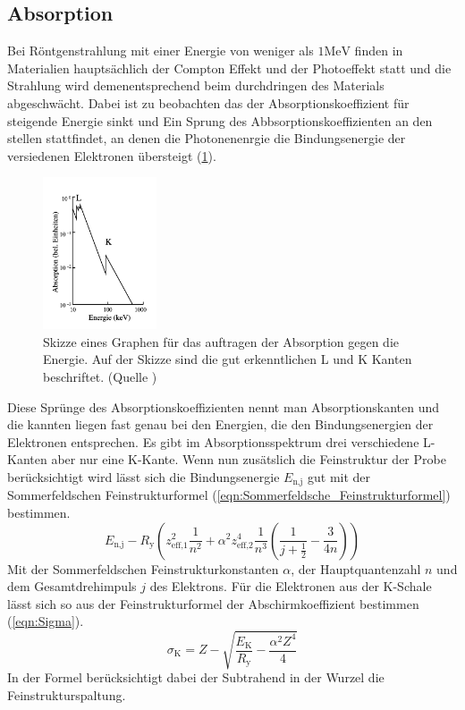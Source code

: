 \subsection{Absorption}
Bei Röntgenstrahlung mit einer Energie von weniger als $1 \text{MeV}$ finden in Materialien hauptsächlich der Compton Effekt und der Photoeffekt statt und die Strahlung wird demenentsprechend beim durchdringen des Materials abgeschwächt.
Dabei ist zu beobachten das der Absorptionskoeffizient für steigende Energie sinkt und Ein Sprung des Abbsorptionskoeffizienten an den stellen stattfindet, an denen die Photonenenrgie die Bindungsenergie der versiedenen Elektronen übersteigt (\ref{fig:Absorption}).
\begin{figure}
    \centering
    \includegraphics[width=0.3\textwidth]{bilder/Absorption.png}
    \caption{Skizze eines Graphen für das auftragen der Absorption gegen die Energie. Auf der Skizze sind die gut erkenntlichen L und K Kanten beschriftet. (Quelle \cite{Anleitung})}
    \label{fig:Absorption}
\end{figure}
Diese Sprünge des Absorptionskoeffizienten nennt man Absorptionskanten und die kannten liegen fast genau bei den Energien, die den Bindungsenergien der Elektronen entsprechen.
Es gibt im Absorptionsspektrum  drei verschiedene L-Kanten aber nur eine K-Kante.
Wenn nun zusätslich die Feinstruktur der Probe berücksichtigt wird lässt sich die Bindungsenergie $E_{\text{n,j}}$ gut mit der Sommerfeldschen Feinstrukturformel (\ref{eqn:Sommerfeldsche_Feinstrukturformel}) bestimmen.
\begin{equation}
    E_{\text{n,j}} -R_{\text{y}}\left(z_{\text{eff,}1}^2\frac{1}{n^2}+\alpha^2z_{\text{eff,}2}^4\frac{1}{n^3}\left(\frac{1}{j+\frac{1}{2}}-\frac{3}{4n}\right) \right)     \label{eqn:Sommerfeldsche_Feinstrukturformel}
\end{equation}
Mit der Sommerfeldschen Feinstrukturkonstanten $\alpha$, der Hauptquantenzahl $n$ und dem Gesamtdrehimpuls $j$ des Elektrons.
Für die Elektronen aus der K-Schale lässt sich so aus der Feinstrukturformel der Abschirmkoeffizient bestimmen (\ref{eqn:Sigma}).
\begin{equation}
    \sigma_{\text{K}} = Z - \sqrt{\frac{E_{\text{K}}}{R_{\text{y}}}-\frac{\alpha^2Z^4}{4}} \label{eqn:Sigma}
\end{equation}
In der Formel berücksichtigt dabei der Subtrahend in der Wurzel die Feinstrukturspaltung.

